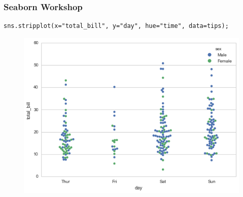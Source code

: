 \documentclass{beamer}
\begin{document}
\begin{frame}[fragile]
	\frametitle{Seaborn Workshop}
	\large
\begin{verbatim}
sns.stripplot(x="total_bill", y="day", hue="time", data=tips);
\end{verbatim}

\begin{figure}
	\centering
	\includegraphics[width=0.7\linewidth]{images/categorical_15_0}
\end{figure}
\end{frame}
\end{document}
